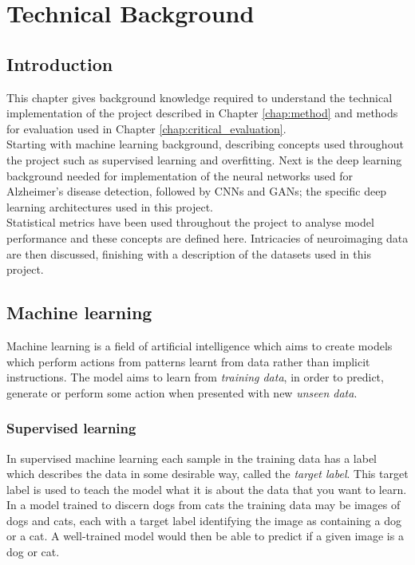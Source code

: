 \documentclass[
    author={Kai Hulme},
    supervisor={Dr Jon Bird},
    degree={BSc},
    title={Generative Adversarial Networks as an Augmentation Technique},
    subtitle={for Alzheimer's Disease Detection in MRI Volumes},
    type={Research},
    year={2021} 
]{dissertation}
\begin{document}
\chapter{Technical Background}
\label{chap:technical}


\section{Introduction}

This chapter gives background knowledge required to understand the technical implementation of the project described in Chapter \ref{chap:method} and methods for evaluation used in Chapter \ref{chap:critical_evaluation}. 
\\

Starting with machine learning background, describing concepts used throughout the project such as supervised learning and overfitting. Next is the deep learning background needed for implementation of the neural networks used for Alzheimer's disease detection, followed by CNNs and GANs; the specific deep learning architectures used in this project. 
\\

Statistical metrics have been used throughout the project to analyse model performance and these concepts are defined here. Intricacies of neuroimaging data are then discussed, finishing with a description of the datasets used in this project.

\section{Machine learning}
 	
Machine learning is a field of artificial intelligence which aims to create models which perform actions from patterns learnt from data rather than implicit instructions. The model aims to learn from \textit{training data}, in order to predict, generate or perform some action when presented with new \textit{unseen data}.

\subsection{Supervised learning}
\label{supervised_learning}

In supervised machine learning each sample in the training data has a label which describes the data in some desirable way, called the \textit{target label}. This target label is used to teach the model what it is about the data that you want to learn. In a model trained to discern dogs from cats the training data may be images of dogs and cats, each with a target label identifying the image as containing a dog or a cat. A well-trained model would then be able to predict if a given image is a dog or cat.
\end{document}

